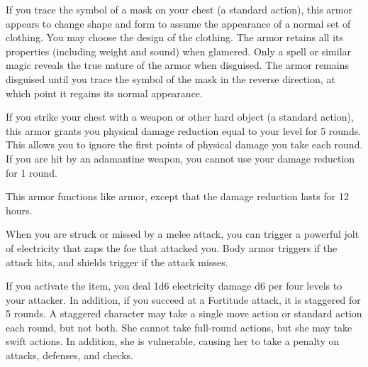
 If you trace the symbol of a mask on your chest (a standard action), this armor appears to change shape and form to assume the appearance of a normal set of clothing. You may choose the design of the clothing. The armor retains all its properties (including weight and sound) when glamered. Only a  spell or similar magic reveals the true nature of the armor when disguised. The armor remains disguised until you trace the symbol of the mask in the reverse direction, at which point it regains its normal appearance. 


 If you strike your chest with a weapon or other hard object (a standard action), this armor grants you physical damage reduction equal to your level for 5 rounds. This allows you to ignore the first points of physical damage you take each round. If you are hit by an adamantine weapon, you cannot use your damage reduction for 1 round.


 This armor functions like  armor, except that the damage reduction lasts for 12 hours.


 When you are struck or missed by a melee attack, you can trigger a powerful jolt of electricity that zaps the foe that attacked you. Body armor triggers if the attack hits, and shields trigger if the attack misses.

If you activate the item, you deal 1d6 electricity damage \add d6 per four levels to your attacker. In addition, if you succeed at a Fortitude attack, it is staggered for 5 rounds. A staggered character may take a single move action or standard action each round, but not both. She cannot take full-round actions, but she may take swift actions. In addition, she is vulnerable, causing her to take a  penalty on attacks, defenses, and checks.

